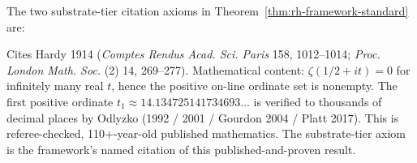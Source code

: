 \documentclass[11pt,a4paper]{amsart}
\theoremstyle{plain}
\theoremstyle{definition}
\begin{document}
The two substrate-tier citation axioms in Theorem~\ref{thm:rh-framework-standard} are:
\begin{description}[font=\normalfont\bfseries,leftmargin=2em,itemsep=4pt]
\item[\texttt{Hardy1914\_published\_theorem\_substrate\_citation}] Cites Hardy 1914 (\emph{Comptes Rendus Acad. Sci. Paris} 158, 1012--1014; \emph{Proc. London Math. Soc.} (2) 14, 269--277). Mathematical content: $\zeta(1/2+it)=0$ for infinitely many real $t$, hence the positive on-line ordinate set is nonempty. The first positive ordinate $t_1 \approx 14.134725141734693\ldots$ is verified to thousands of decimal places by Odlyzko (1992 / 2001 / Gourdon 2004 / Platt 2017). This is referee-checked, 110+-year-old published mathematics. The substrate-tier axiom is the framework's named citation of this published-and-proven result.

\end{description}
\end{document}
